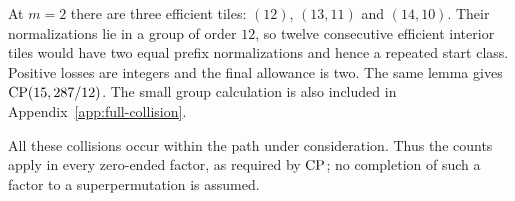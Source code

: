 At $m=2$ there are three efficient tiles: $(12)$, $(13,11)$ and
$(14,10)$. Their normalizations lie in a group of order $12$, so
twelve consecutive efficient interior tiles would have two equal
prefix normalizations and hence a repeated start class. Positive
losses are integers and the final allowance is two. The same lemma
gives $\operatorname{CP}(15,287/12)$. The small group calculation is also included
in Appendix~\ref{app:full-collision}.

All these collisions occur within the path under consideration. Thus
the counts apply in every zero-ended factor, as required by $\operatorname{CP}$;
no completion of such a factor to a superpermutation is assumed.
